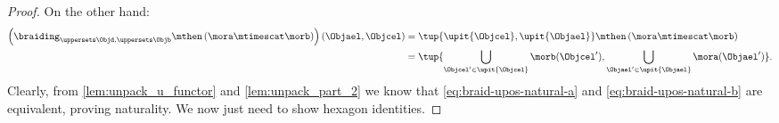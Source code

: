 \begin{proof}
    On the other hand:
    \begin{equation}
        \label{eq:braid-upos-natural-b}
    \begin{aligned}
        \left(\braiding_{\uppersets \Objd, \uppersets \Objb}\mthen \left( \mora \mtimescat \morb\right)\right)(\Objael,\Objcel)&=
        \tup{\upit\{\Objcel\},\upit\{\Objael\}}\mthen \left( \mora \mtimescat \morb\right)\\
        &=\tup{\bigcup_{\Objcel'\in \upit\{\Objcel\}} \morb(\Objcel'),\bigcup_{\Objael'\in \upit\{\Objael\}}\mora(\Objael')}.
    \end{aligned}
    \end{equation}
    Clearly, from \cref{lem:unpack_u_functor} and \cref{lem:unpack_part_2} we know that \cref{eq:braid-upos-natural-a} and \cref{eq:braid-upos-natural-b} are equivalent, proving naturality.
    We now just need to show hexagon identities.
\end{proof}

